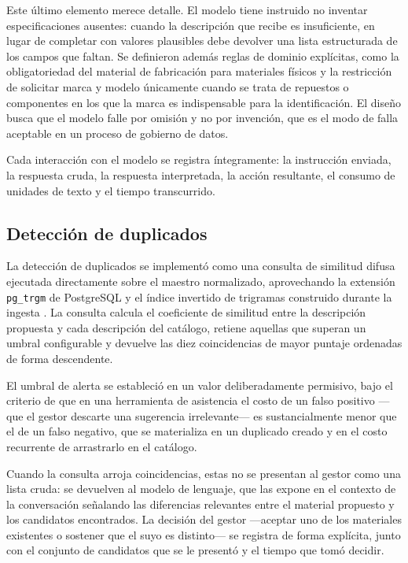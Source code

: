 Este último elemento merece detalle. El modelo tiene instruido no inventar especificaciones ausentes: cuando la descripción que recibe es insuficiente, en lugar de completar con valores plausibles debe devolver una lista estructurada de los campos que faltan. Se definieron además reglas de dominio explícitas, como la obligatoriedad del material de fabricación para materiales físicos y la restricción de solicitar marca y modelo únicamente cuando se trata de repuestos o componentes en los que la marca es indispensable para la identificación. El diseño busca que el modelo falle por omisión y no por invención, que es el modo de falla aceptable en un proceso de gobierno de datos.

Cada interacción con el modelo se registra íntegramente: la instrucción enviada, la respuesta cruda, la respuesta interpretada, la acción resultante, el consumo de unidades de texto y el tiempo transcurrido.

\subsection{Detección de duplicados}
La detección de duplicados se implementó como una consulta de similitud difusa ejecutada directamente sobre el maestro normalizado, aprovechando la extensión \texttt{pg\_trgm} de PostgreSQL y el índice invertido de trigramas construido durante la ingesta \cite{gravano2001}. La consulta calcula el coeficiente de similitud entre la descripción propuesta y cada descripción del catálogo, retiene aquellas que superan un umbral configurable y devuelve las diez coincidencias de mayor puntaje ordenadas de forma descendente.

El umbral de alerta se estableció en un valor deliberadamente permisivo, bajo el criterio de que en una herramienta de asistencia el costo de un falso positivo —que el gestor descarte una sugerencia irrelevante— es sustancialmente menor que el de un falso negativo, que se materializa en un duplicado creado y en el costo recurrente de arrastrarlo en el catálogo.

Cuando la consulta arroja coincidencias, estas no se presentan al gestor como una lista cruda: se devuelven al modelo de lenguaje, que las expone en el contexto de la conversación señalando las diferencias relevantes entre el material propuesto y los candidatos encontrados. La decisión del gestor —aceptar uno de los materiales existentes o sostener que el suyo es distinto— se registra de forma explícita, junto con el conjunto de candidatos que se le presentó y el tiempo que tomó decidir.

